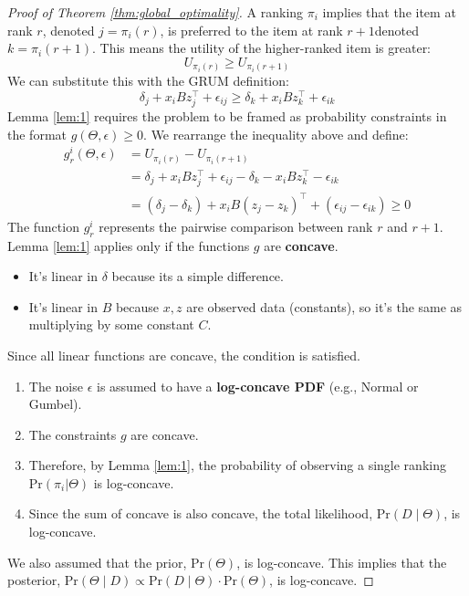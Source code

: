 \begin{proof}[Proof of Theorem \ref{thm:global_optimality}]
    A ranking $\pi_{i}$ implies that the item at rank $r$, denoted $j=\pi_{i}(r)$, is preferred to the item at rank $r+1$denoted $k=\pi_{i}(r+1)$.
    This means the utility of the higher-ranked item is greater:
    $$
    U_{\pi_{i}(r)} \geq  U_{\pi_{i}(r+1)}
    $$
    We can substitute this with the GRUM definition:
    $$
    \delta_{j} + x_{i} B z^{\top}_{j} + \epsilon_{ij} \geq 
    \delta_{k} + x_{i} B z^{\top}_{k} + \epsilon_{ik}
    $$
    Lemma \ref{lem:1} requires the problem to be framed as probability constraints in the format $g(\Theta,\epsilon) \geq 0$.
    We rearrange the inequality above and define:
    \begin{align*}
    g^{i}_{r}(\Theta,\epsilon) 
    &= U_{\pi_{i}(r)} -  U_{\pi_{i}(r+1)} \\
    &= \delta_{j} + x_{i} B z^{\top}_{j} + \epsilon_{ij} - 
    \delta_{k} - x_{i} B z^{\top}_{k} - \epsilon_{ik} \\
    &= (\delta_{j}- \delta_{k}) + x_{i} B (z_{j} - z_{k})^{\top} + (\epsilon_{ij} - \epsilon_{ik}) \geq 0
    \end{align*}
    The function $g^{i}_{r}$ represents the pairwise comparison between rank $r$ and $r+1$.
    Lemma \ref{lem:1} applies only if the functions $g$ are \textbf{concave}.
    \begin{itemize}
        \item It's linear in $\delta$ because its a simple difference.
        \item It's linear in $B$ because $x,z$ are observed data (constants), so it's the same as multiplying by some constant $C$. 
    \end{itemize}
    Since all linear functions are concave, the condition is satisfied.
    \begin{enumerate}
        \item The noise $\epsilon$ is assumed to have a \textbf{log-concave PDF} (e.g., Normal or Gumbel).
        \item The constraints $g$ are concave.
        \item Therefore, by Lemma \ref{lem:1}, the probability of observing a single ranking $\mathrm{Pr}(\pi_{i}|\Theta)$ is log-concave.
        \item Since the sum of concave is also concave, the total likelihood, $\mathrm{Pr}(D \mid \Theta)$, is log-concave.
    \end{enumerate}
    We also assumed that the prior, $\mathrm{Pr}(\Theta)$, is log-concave.
    This implies that the posterior, $\mathrm{Pr}(\Theta \mid D) \propto \mathrm{Pr}(D \mid \Theta) \cdot \mathrm{Pr}(\Theta)$, is log-concave.
\end{proof}

